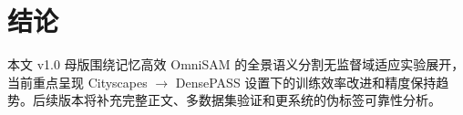 \section{结论}
\label{sec:conclusion}

本文 v1.0 母版围绕记忆高效 OmniSAM 的全景语义分割无监督域适应实验展开，当前重点呈现 Cityscapes $\rightarrow$ DensePASS 设置下的训练效率改进和精度保持趋势。后续版本将补充完整正文、多数据集验证和更系统的伪标签可靠性分析。
